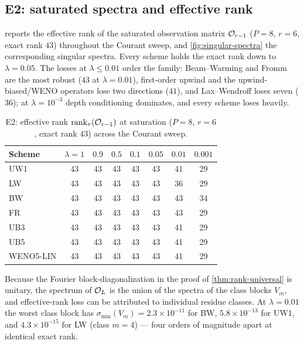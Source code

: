 \documentclass[pdflatex,sn-mathphys-num]{sn-jnl}%
\theoremstyle{thmstyleone}%
\theoremstyle{thmstyletwo}%
\theoremstyle{thmstylethree}%
\DeclareMathOperator{\rank}{rank}
\newcommand{\OL}{{\cal O}_L}
\begin{document}
\subsection{E2: saturated spectra and effective rank}\label{sec:exp-spectra}

 reports the effective rank of the saturated observation matrix ${\cal O}_{r-1}$ ($P=8$, $r=6$, exact rank $43$) throughout the Courant sweep, and \cref{fig:singular-spectra} the corresponding singular spectra.
Every scheme holds the exact rank down to $\lambda=0.05$.
The losses at $\lambda\le0.01$ order the family: Beam--Warming and Fromm are the most robust ($43$ at $\lambda=0.01$), first-order upwind and the upwind-biased/WENO operators lose two directions ($41$), and Lax--Wendroff loses seven ($36$); at $\lambda=10^{-3}$ depth conditioning dominates, and every scheme loses heavily.

\begin{table}[htbp]
\centering
\caption{E2: effective rank $\rank_\tau({\cal O}_{r-1})$ at saturation ($P=8$, $r=6$, exact rank $43$) across the Courant sweep.}
\label{tab:eff-rank-sat}
\begin{tabular}{@{}lccccccc@{}}
\toprule
Scheme    & $\lambda=1$ & $0.9$ & $0.5$ & $0.1$ & $0.05$ & $0.01$ & $0.001$ \\
\midrule
UW1       & 43          & 43    & 43    & 43    & 43     & 41     & 29      \\
LW        & 43          & 43    & 43    & 43    & 43     & 36     & 29      \\
BW        & 43          & 43    & 43    & 43    & 43     & 43     & 34      \\
FR        & 43          & 43    & 43    & 43    & 43     & 43     & 29      \\
UB3       & 43          & 43    & 43    & 43    & 43     & 41     & 29      \\
UB5       & 43          & 43    & 43    & 43    & 43     & 41     & 29      \\
WENO5-LIN & 43          & 43    & 43    & 43    & 43     & 41     & 29      \\
\bottomrule
\end{tabular}
\end{table}

Because the Fourier block-diagonalization in the proof of \cref{thm:rank-universal} is unitary, the spectrum of $\OL$ is the union of the spectra of the class blocks $V_m$, and effective-rank loss can be attributed to individual residue classes.
At $\lambda=0.01$ the worst class block has $\sigma_{\min}(V_m)=2.3\times10^{-11}$ for BW, $5.8\times10^{-13}$ for UW1, and $4.3\times10^{-15}$ for LW (class $m=4$) --- four orders of magnitude apart at identical exact rank.
\end{document}
